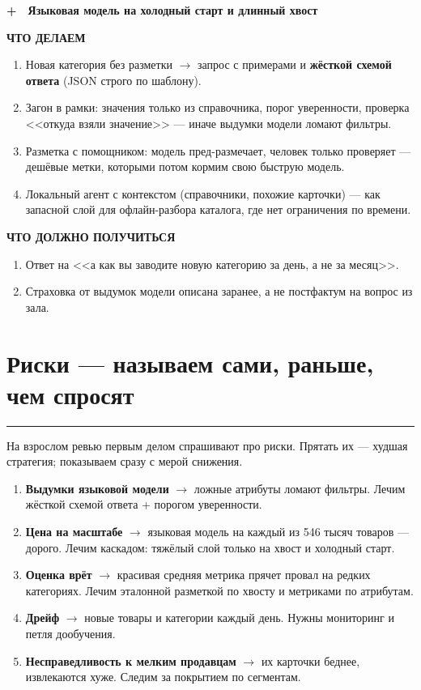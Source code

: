 \documentclass[11pt,a4paper]{article}
\newcommand{\secrule}{%
  \par\vspace{4pt}%
  {\color{mvred}\noindent\rule{\linewidth}{0.9pt}\par}%
  \vspace{8pt}%
}
\newcommand{\dayblock}[4]{%
  \begin{tcolorbox}[
    enhanced,
    colback=white,
    colframe=rulec,
    boxrule=0.65pt,
    arc=2pt,
    left=8pt,
    right=8pt,
    top=8pt,
    bottom=8pt,
    before skip=3pt,
    after skip=11pt,
  ]
  {\color{mvred}\bfseries #1}~~{\bfseries #2}\par\vspace{4pt}%
  {\scriptsize\bfseries\color{inksoft}ЧТО ДЕЛАЕМ}\par\vspace{1pt}%
  #3\par\vspace{5pt}%
  {\scriptsize\bfseries\color{mint}ЧТО ДОЛЖНО ПОЛУЧИТЬСЯ}\par\vspace{1pt}%
  #4%
  \end{tcolorbox}%
}
\begin{document}
\dayblock{+}{Языковая модель на холодный старт и длинный хвост}{%
\begin{enumerate}
  \item Новая категория без разметки $\to$ запрос с примерами и \textbf{жёсткой схемой ответа} (JSON строго по шаблону).
  \item Загон в рамки: значения только из справочника, порог уверенности, проверка <<откуда взяли значение>> --- иначе выдумки модели ломают фильтры.
  \item Разметка с помощником: модель пред-размечает, человек только проверяет --- дешёвые метки, которыми потом кормим свою быструю модель.
  \item Локальный агент с контекстом (справочники, похожие карточки) --- как запасной слой для офлайн-разбора каталога, где нет ограничения по времени.
\end{enumerate}
}{%
\begin{enumerate}
  \item Ответ на <<а как вы заводите новую категорию за день, а не за месяц>>.
  \item Страховка от выдумок модели описана заранее, а не постфактум на вопрос из зала.
\end{enumerate}
}

\section{Риски --- называем сами, раньше, чем спросят}
\secrule
На взрослом ревью первым делом спрашивают про риски. Прятать их --- худшая стратегия; показываем сразу с мерой снижения.
\begin{enumerate}
  \item \textbf{Выдумки языковой модели} $\to$ ложные атрибуты ломают фильтры. Лечим жёсткой схемой ответа + порогом уверенности.
  \item \textbf{Цена на масштабе} $\to$ языковая модель на каждый из 546 тысяч товаров --- дорого. Лечим каскадом: тяжёлый слой только на хвост и холодный старт.
  \item \textbf{Оценка врёт} $\to$ красивая средняя метрика прячет провал на редких категориях. Лечим эталонной разметкой по хвосту и метриками по атрибутам.
  \item \textbf{Дрейф} $\to$ новые товары и категории каждый день. Нужны мониторинг и петля дообучения.
  \item \textbf{Несправедливость к мелким продавцам} $\to$ их карточки беднее, извлекаются хуже. Следим за покрытием по сегментам.
\end{enumerate}
\end{document}
